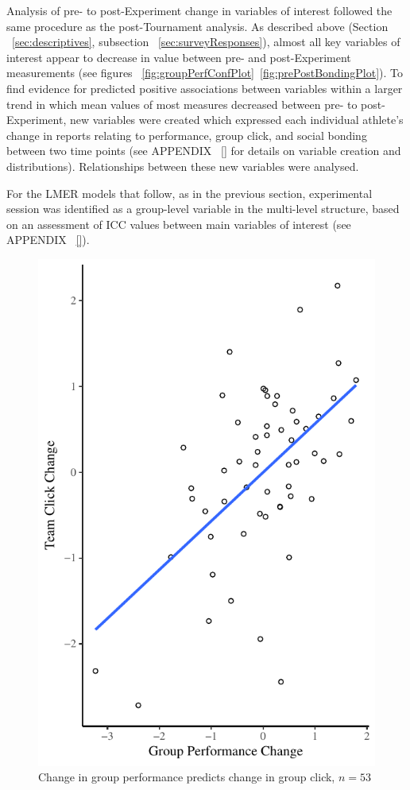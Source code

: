 Analysis of pre- to post-Experiment change in variables of interest followed the same procedure as the post-Tournament analysis.  As described above (Section ~\ref{sec:descriptives}, subsection ~\ref{sec:surveyResponses}), almost all key variables of interest appear to decrease in value between pre- and post-Experiment measurements (see figures ~\ref{fig:groupPerfConfPlot}\nobreakdash~\ref{fig:prePostBondingPlot}).  To find evidence for predicted positive associations between variables within a larger trend in which mean values of most measures decreased between pre- to post-Experiment, new variables were created which expressed each individual athlete's change in reports relating to performance, group click, and social bonding between two time points (see APPENDIX ~\ref{} for details on variable creation and distributions).  Relationships between these new variables were analysed.

For the LMER models that follow, as in the previous section, experimental session was identified as a group-level variable in the multi-level structure, based on an assessment of ICC values between main variables of interest (see APPENDIX ~\ref{}).

%






\begin{figure}
    \centering
    \includegraphics[width=0.5\linewidth,keepaspectratio] {images/groupPerfClickChangeCondition}
    \caption{Change in group performance predicts change in group click, $n = 53$}
    \label{fig:groupPerfClickChangeCondition}
\end{figure}

